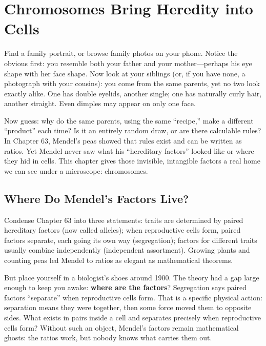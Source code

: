 \chapter{Chromosomes Bring Heredity into Cells}

\begin{kaichang}
Find a family portrait, or browse family photos on your phone. Notice the obvious first: you resemble both your father and your mother---perhaps his eye shape with her face shape. Now look at your siblings (or, if you have none, a photograph with your cousins): you come from the same parents, yet no two look exactly alike. One has double eyelids, another single; one has naturally curly hair, another straight. Even dimples may appear on only one face.

Now guess: why do the same parents, using the same ``recipe,'' make a different ``product'' each time? Is it an entirely random draw, or are there calculable rules? In Chapter 63, Mendel's peas showed that rules exist and can be written as ratios. Yet Mendel never saw what his ``hereditary factors'' looked like or where they hid in cells. This chapter gives those invisible, intangible factors a real home we can see under a microscope: chromosomes.
\end{kaichang}

\section{Where Do Mendel's Factors Live?}

Condense Chapter 63 into three statements: traits are determined by paired hereditary factors (now called alleles); when reproductive cells form, paired factors separate, each going its own way (segregation); factors for different traits usually combine independently (independent assortment). Growing plants and counting peas led Mendel to ratios as elegant as mathematical theorems.

But place yourself in a biologist's shoes around 1900. The theory had a gap large enough to keep you awake: \textbf{where are the factors}? Segregation says paired factors ``separate'' when reproductive cells form. That is a specific physical action: separation means they were together, then some force moved them to opposite sides. What exists in pairs inside a cell and separates precisely when reproductive cells form? Without such an object, Mendel's factors remain mathematical ghosts: the ratios work, but nobody knows what carries them out.

